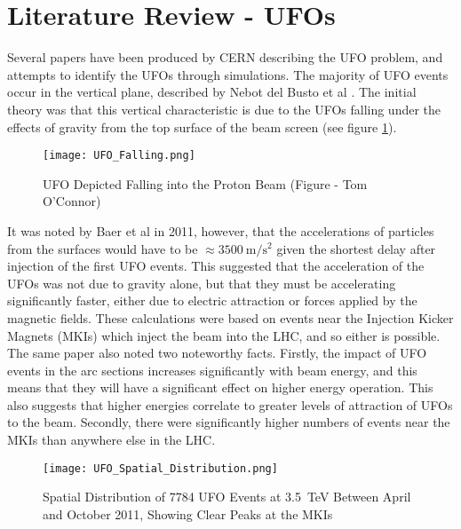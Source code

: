 \documentclass[../main.tex]{subfiles}
\begin{document}
	\pagebreak
\section{Literature Review - UFOs} \label{UFO_Lit_Review}
Several papers have been produced by CERN describing the UFO problem, and attempts to identify the UFOs through simulations.
The majority of UFO events occur in the vertical plane, described by Nebot del Busto et al \cite{nebot_vertical}.
The initial theory was that this vertical characteristic is due to the UFOs falling under the effects of gravity from the top surface of the beam screen (see figure \ref{fig:UFO_Falling}).\\

\begin{figure}[ht]
	\centering
	\texttt{[image: UFO\_Falling.png]}
	\caption{UFO Depicted Falling into the Proton Beam (Figure - Tom O'Connor)}
	\label{fig:UFO_Falling}
\end{figure}

It was noted by Baer et al \cite{baer_accel} in 2011, however, that the accelerations of particles from the surfaces would have to be $\approx \SI{3500}{\metre\per\second\squared}$ given the shortest delay after injection of the first UFO events.
This suggested that the acceleration of the UFOs was not due to gravity alone, but that they must be accelerating significantly faster, either due to electric attraction or forces applied by the magnetic fields.
These calculations were based on events near the Injection Kicker Magnets (MKIs) which inject the beam into the LHC, and so either is possible.
The same paper also noted two noteworthy facts.
Firstly, the impact of UFO events in the arc sections increases significantly with beam energy, and this means that they will have a significant effect on higher energy operation.
This also suggests that higher energies correlate to greater levels of attraction of UFOs to the beam.
Secondly, there were significantly higher numbers of events near the MKIs than anywhere else in the LHC.\\

\begin{figure}[ht]
	\centering
	\texttt{[image: UFO\_Spatial\_Distribution.png]}
	\caption{Spatial Distribution of 7784 UFO Events at \SI{3.5}{\tera\electronvolt} Between April and October 2011, Showing  Clear Peaks at the MKIs \cite{baer_distributions}}
\end{figure}   
\end{document}
